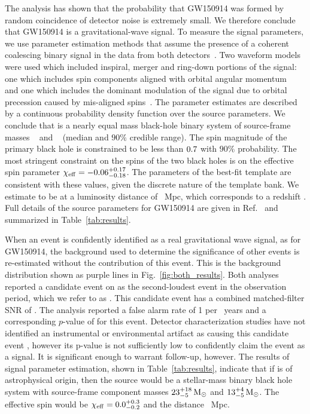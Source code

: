 The \pycbc{} analysis has shown that the probability that GW150914 was formed by
random coincidence of detector noise is extremely small. We therefore conclude
that GW150914 is a gravitational-wave signal. To measure the signal
parameters, we use parameter estimation methods that assume the presence of a
coherent coalescing binary signal in the data from both
detectors~\cite{Veitch:2014wba,GW150914-PARAMESTIM}. Two waveform models were
used which included inspiral, merger and ring-down portions of the signal: one
which includes spin components aligned with orbital angular
momentum~\cite{Pan:2009wj,Puerrer:2014fza} and one which includes the dominant
modulation of the signal due to orbital precession caused by mis-aligned
spins~\cite{Hannam:2013oca,Khan:2015jqa}.  The parameter estimates are
described by a continuous probability density function over the source
parameters. We conclude that \TheEvent{} is a nearly equal mass black-hole
binary system of source-frame masses {\MONESCOMPACT~\Msun} and
{\MTWOSCOMPACT~\Msun} (median and $90\%$ credible range). The spin magnitude
of the primary black hole is constrained to be less than ${0.7}$
with $90\%$ probability.  The most stringent constraint on the spins of the
two black holes is on the effective spin parameter $\chi_\mathrm{eff} =
-0.06_{-0.18}^{+0.17}$.  The parameters of the best-fit template are consistent with
these values, given the discrete nature of the template bank.  We estimate
\TheEvent{} to be at a luminosity distance of
{\DISTANCECOMPACT~$\mathrm{Mpc}$}, which corresponds to a redshift
{\REDSHIFTCOMPACT}.  Full details of the source parameters for GW150914 are
given in Ref.~\cite{GW150914-PARAMESTIM} and summarized in
Table~\ref{tab:results}.

When an event is confidently identified as a real gravitational wave signal,
as for GW150914, the background used to determine the significance of other
events is re-estimated without the contribution of this event. This is the
background distribution shown as purple lines in Fig.~\ref{fig:both_results}.
Both analyses reported a candidate event on \SecondTime{} as the
second-loudest event in the observation period, which we refer to as
\SECONDMONDAY. This candidate event has a combined matched-filter SNR of
\PyCBCSecondEventRhoC.  The \pycbc{} analysis reported a false alarm rate of 1
per \CBCSECONDEVENTIFAR~years and a corresponding $p$-value of
\CBCSECONDEVENTFAP{} for this event.
Detector characterization studies have not identified an
instrumental or environmental artifact as causing this candidate event
\cite{GW150914-DETCHAR}, however its p-value is not
sufficiently low to confidently claim the event as a signal.  It is
significant enough to warrant follow-up, however.  The results of signal
parameter estimation, shown in Table~\ref{tab:results}, indicate that if
\SECONDMONDAY{} is of astrophysical origin, then the source would be a
stellar-mass binary black hole system with source-frame component masses
$23_{-5}^{+18}\,\mathrm{M}_\odot$ and $13_{-5}^{+4}\,\mathrm{M}_\odot$. The
effective spin would be $\chi_\mathrm{eff} = 0.0_{-0.2}^{+0.3}$ and
the distance \DISTANCECOMPACTSecondMonday~Mpc.

